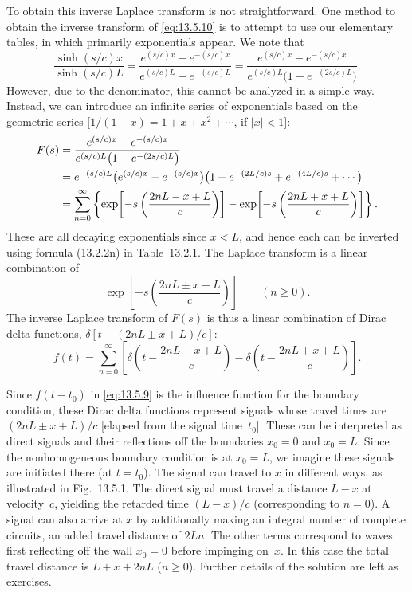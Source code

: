 To obtain this inverse Laplace transform is not straightforward.  One method to obtain the inverse transform of \eqref{eq:13.5.10} is to attempt to use our elementary tables, in which primarily exponentials appear.  We note that
\[
\frac{\sinh(s/c)x}{\sinh(s/c)L}
= \frac{e^{(s/c)x} - e^{-(s/c)x}}{e^{(s/c)L} - e^{-(s/c)L}}
= \frac{e^{(s/c)x} - e^{-(s/c)x}}{e^{(s/c)L}\bigl(1 - e^{-(2s/c)L}\bigr)}.
\]
However, due to the denominator, this cannot be analyzed in a simple way.  Instead, we can introduce an infinite series of exponentials based on the geometric series $[1/(1-x) = 1 + x + x^2 + \cdots$, if $|x| < 1]$:
\begin{align}
F(s) &= \frac{e^{(s/c)x} - e^{-(s/c)x}}{e^{(s/c)L}\bigl(1 - e^{-(2s/c)L}\bigr)} \notag\\
     &= e^{-(s/c)L}\bigl(e^{(s/c)x} - e^{-(s/c)x}\bigr)
        \bigl(1 + e^{-(2L/c)s} + e^{-(4L/c)s} + \cdots\bigr) \notag\\
     &= \sum_{n=0}^{\infty}\left\{
        \exp\!\left[-s\left(\frac{2nL - x + L}{c}\right)\right]
        - \exp\!\left[-s\left(\frac{2nL + x + L}{c}\right)\right]
        \right\}.
\label{eq:13.5.11}
\end{align}
These are all decaying exponentials since $x < L$, and hence each can be inverted using formula (13.2.2n) in Table~13.2.1.  The Laplace transform is a linear combination of
\[
\exp\!\left[-s\left(\frac{2nL \pm x + L}{c}\right)\right]
\qquad (n \ge 0).
\]
The inverse Laplace transform of $F(s)$ is thus a linear combination of Dirac delta functions, $\delta[t - (2nL \pm x + L)/c]$:
\[
f(t) = \sum_{n=0}^{\infty}\left[
\delta\!\left(t - \frac{2nL - x + L}{c}\right)
- \delta\!\left(t - \frac{2nL + x + L}{c}\right)
\right].
\]

Since $f(t-t_0)$ in \eqref{eq:13.5.9} is the influence function for the boundary condition, these Dirac delta functions represent signals whose travel times are $(2nL \pm x + L)/c$ [elapsed from the signal time~$t_0$].  These can be interpreted as direct signals and their reflections off the boundaries $x_0 = 0$ and $x_0 = L$.  Since the nonhomogeneous boundary condition is at $x_0 = L$, we imagine these signals are initiated there (at $t = t_0$).  The signal can travel to $x$ in different ways, as illustrated in Fig.~13.5.1.  The direct signal must travel a distance $L - x$ at velocity~$c$, yielding the retarded time $(L-x)/c$ (corresponding to $n = 0$).  A signal can also arrive at $x$ by additionally making an integral number of complete circuits, an added travel distance of $2Ln$.  The other terms correspond to waves first reflecting off the wall $x_0 = 0$ before impinging on~$x$.  In this case the total travel distance is $L + x + 2nL$ ($n \ge 0$).  Further details of the solution are left as exercises.


